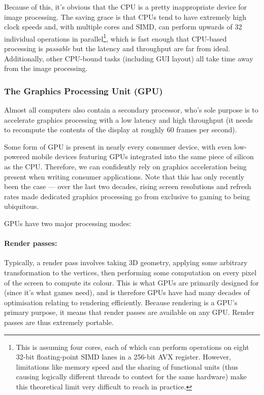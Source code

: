 \documentclass[12pt]{article}
\begin{document}
Because of this, it's obvious that the CPU is a pretty inappropriate device for image processing.
The saving grace is that CPUs tend to have extremely high clock speeds and, with multiple cores and
SIMD, can perform upwards of 32 individual operations in parallel\footnote{This is assuming four
cores, each of which can perform operations on eight 32-bit floating-point SIMD lanes in a 256-bit
AVX register.  However, limitations like memory speed and the sharing of functional units (thus
causing logically different threads to contest for the same hardware) make this theoretical limit
very difficult to reach in practice.}, which is fast enough that CPU-based processing is
\emph{passable} but the latency and throughput are far from ideal.  Additionally, other CPU-bound
tasks (including GUI layout) all take time away from the image processing.

\subsubsection{The Graphics Processing Unit (GPU)}

Almost all computers also contain a secondary processor, who's sole purpose is to accelerate
graphics processing with a low latency and high throughput (it needs to recompute the contents of
the display at roughly 60 frames per second).

Some form of GPU is present in nearly every consumer device, with even low-powered mobile devices
featuring GPUs integrated into the same piece of silicon as the CPU.  Therefore, we can confidently
rely on graphics acceleration being present when writing consumer applications.  Note that this has
only recently been the case --- over the last two decades, rising screen resolutions and refresh
rates made dedicated graphics processing go from exclusive to gaming to being ubiquitous.

GPUs have two major processing modes:

\paragraph{Render passes:} Typically, a render pass involves taking 3D geometry, applying some
arbitrary transformation to the vertices, then performing some computation on every pixel of the
screen to compute its colour.  This is what GPUs are primarily designed for (since it's what games
need), and is therefore GPUs have had many decades of optimisation relating to rendering
efficiently.  Because rendering is a GPU's primary purpose, it means that render passes are
available on any GPU.  Render passes are thus extremely portable.
\end{document}
